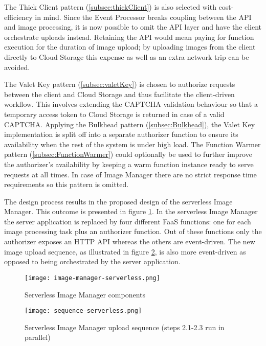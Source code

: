 The Thick Client pattern (\ref{subsec:thickClient}) is also selected with cost-efficiency in mind. Since the Event Processor breaks coupling between the API and image processing, it is now possible to omit the API layer and have the client orchestrate uploads instead. Retaining the API would mean paying for function execution for the duration of image upload; by uploading images from the client directly to Cloud Storage this expense as well as an extra network trip can be avoided.

The Valet Key pattern (\ref{subsec:valetKey}) is chosen to authorize requests between the client and Cloud Storage and thus facilitate the client-driven workflow. This involves extending the CAPTCHA validation behaviour so that a temporary access token to Cloud Storage is returned in case of a valid CAPTCHA. Applying the Bulkhead pattern (\ref{subsec:Bulkhead}), the Valet Key implementation is split off into a separate authorizer function to ensure its availability when the rest of the system is under high load. The Function Warmer pattern (\ref{subsec:FunctionWarmer}) could optionally be used to further improve the authorizer's availability by keeping a warm function instance ready to serve requests at all times. In case of Image Manager there are no strict response time requirements so this pattern is omitted.

The design process results in the proposed design of the serverless Image Manager. This outcome is presented in figure \ref{fig:serverlessArchitecture}. In the serverless Image Manager the server application is replaced by four different FaaS functions: one for each image processing task plus an authorizer function. Out of these functions only the authorizer exposes an HTTP API whereas the others are event-driven. The new image upload sequence, as illustrated in figure \ref{fig:serverlessSequence}, is also more event-driven as opposed to being orchestrated by the server application.


\begin{figure}[h]
  \centering
  \texttt{[image: image-manager-serverless.png]}
  \caption{Serverless Image Manager components}
  \label{fig:serverlessArchitecture}
\end{figure}

\begin{figure}[h]
  \centering
  \texttt{[image: sequence-serverless.png]}
  \caption{Serverless Image Manager upload sequence (steps 2.1-2.3 run in parallel)}
  \label{fig:serverlessSequence}
\end{figure}

